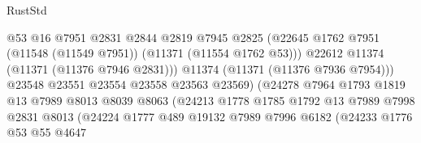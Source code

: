 \begin{lexlean}{RustStd}
\begin{coremodule}
                                          @53
                                          @16
                                          @7951
                                          @2831
                                          @2844
                                          @2819
                                          @7945
                                          @2825
                                          (@22645
                                            @1762
                                            @7951
                                            (@11548 (@11549 @7951))
                                            (@11371 (@11554 @1762 @53)))
                                          @22612
                                          @11374
                                          (@11371 (@11376 @7946 @2831)))
                                        @11374
                                        (@11371 (@11376 @7936 @7954)))
                                      @23548
                                      @23551
                                      @23554
                                      @23558
                                      @23563
                                      @23569)
                                    (@24278
                                      @7964
                                      @1793
                                      @1819
                                      @13
                                      @7989
                                      @8013
                                      @8039
                                      @8063
                                      (@24213
                                        @1778
                                        @1785
                                        @1792
                                        @13
                                        @7989
                                        @7998
                                        @2831
                                        @8013
                                        (@24224
                                          @1777
                                          @489
                                          @19132
                                          @7989
                                          @7996
                                          @6182
                                          (@24233
                                            @1776
                                            @53
                                            @55
                                            @4647

\end{coremodule}
\end{lexlean}
